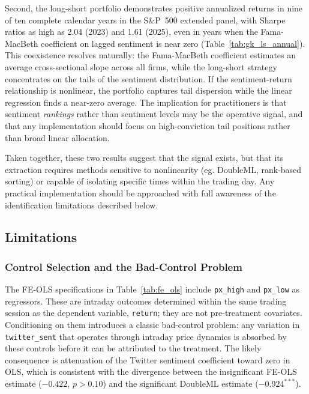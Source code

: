 Second, the long-short portfolio demonstrates positive annualized returns in nine of
ten complete calendar years in the S\&P~500 extended panel, with Sharpe ratios
as high as 2.04 (2023) and 1.61 (2025), even in years when the
Fama-MacBeth coefficient on lagged sentiment is near zero
(Table~\ref{tab:gk_ls_annual}). This coexistence resolves naturally: the
Fama-MacBeth coefficient estimates an average cross-sectional slope across all
firms, while the long-short strategy concentrates on the tails of the
sentiment distribution. If the sentiment-return relationship is nonlinear, the portfolio captures
tail dispersion while the linear regression finds a near-zero average. The
implication for practitioners is that sentiment \emph{rankings} rather than
sentiment levels may be the operative signal, and that any implementation
should focus on high-conviction tail positions rather than broad linear
allocation.

Taken together, these two results suggest that the signal exists, but that its
extraction requires methods sensitive to nonlinearity (eg. DoubleML, rank-based
sorting) or capable of isolating specific times within the trading day.
Any practical implementation should be approached with full awareness of the
identification limitations described below.

\subsection{Limitations}\label{limitations}

\subsubsection{Control Selection and the Bad-Control Problem}

The FE-OLS specifications in Table~\ref{tab:fe_ols} include \texttt{px\_high}
and \texttt{px\_low} as regressors. These are intraday outcomes determined
within the same trading session as the dependent variable, \texttt{return};
they are not pre-treatment covariates. Conditioning on them introduces a
classic bad-control problem: any variation in \texttt{twitter\_sent} that
operates through intraday price dynamics is absorbed by these controls before
it can be attributed to the treatment. The likely consequence is attenuation
of the Twitter sentiment coefficient toward zero in OLS, which is consistent
with the divergence between the insignificant FE-OLS estimate ($-0.422$, $p >
0.10$) and the significant DoubleML estimate ($-0.924^{***}$).

